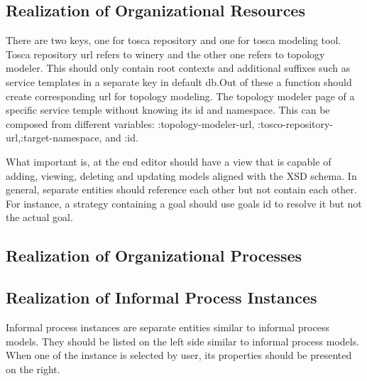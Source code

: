 \subsection{Realization of Organizational Resources}
There are two keys, one for tosca repository and one for tosca modeling tool. Tosca repository url refers to winery and the other one refers to topology modeler. This should only contain root contexts and additional suffixes such as service templates in a separate key in default db.Out of these a function should create corresponding url for topology modeling. The topology modeler page of a specific service temple without knowing its id and namespace. This can be composed from different variables: :topology-modeler-url, :tosco-repository-url,:target-namespace, and :id.


	
		
What important is, at the end editor should have a view that is capable of adding, viewing, deleting and updating models aligned with the XSD schema. In general, separate entities should reference each other but not contain each other. For instance, a strategy containing a goal should use goals id to resolve it but not the actual goal.
	
	\subsection{Realization of Organizational Processes}
	
	
	\subsection{Realization of Informal Process Instances}
	Informal process instances are separate entities similar to informal process models. They should be listed on the left side similar to informal process models. When one of the instance is selected by user, its properties should be presented on the right.
	
